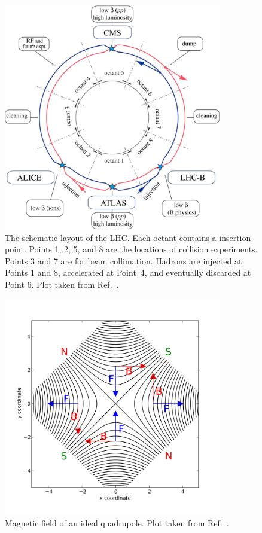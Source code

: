\begin{figure}[!htb]
    \centering
    \captionsetup{justification=justified}
    \includegraphics[width=0.85\textwidth]{pics/LHC_CMS/LHC_scheme.jpg}
    \caption{The schematic layout of the LHC. Each octant contains a insertion point.
             Points 1, 2, 5, and 8 are the locations of collision experiments. Points 3 and 7 are for beam collimation. 
             Hadrons are injected at Points 1 and 8, accelerated at Point~4, and eventually discarded at Point 6.
             Plot taken from Ref.~\cite{Evans_2008}. }
    \label{fig:lhc_scheme}
\end{figure}

\begin{figure}[!htb]
    \centering
    \captionsetup{justification=centering}
    \includegraphics[width=0.85\textwidth]{pics/LHC_CMS/quadrupole_field.png}
    \caption{Magnetic field of an ideal quadrupole.
             Plot taken from Ref.~\cite{quadrupole_wiki}.}
    \label{fig:quad_field}
\end{figure}

